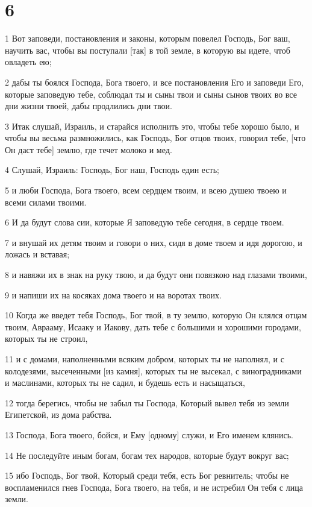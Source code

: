 \chapter{6}

\par 1 Вот заповеди, постановления и законы, которым повелел Господь, Бог ваш, научить вас, чтобы вы поступали [так] в той земле, в которую вы идете, чтоб овладеть ею;
\par 2 дабы ты боялся Господа, Бога твоего, и все постановления Его и заповеди Его, которые заповедую тебе, соблюдал ты и сыны твои и сыны сынов твоих во все дни жизни твоей, дабы продлились дни твои.
\par 3 Итак слушай, Израиль, и старайся исполнить это, чтобы тебе хорошо было, и чтобы вы весьма размножились, как Господь, Бог отцов твоих, говорил тебе, [что Он даст тебе] землю, где течет молоко и мед.
\par 4 Слушай, Израиль: Господь, Бог наш, Господь един есть;
\par 5 и люби Господа, Бога твоего, всем сердцем твоим, и всею душею твоею и всеми силами твоими.
\par 6 И да будут слова сии, которые Я заповедую тебе сегодня, в сердце твоем.
\par 7 и внушай их детям твоим и говори о них, сидя в доме твоем и идя дорогою, и ложась и вставая;
\par 8 и навяжи их в знак на руку твою, и да будут они повязкою над глазами твоими,
\par 9 и напиши их на косяках дома твоего и на воротах твоих.
\par 10 Когда же введет тебя Господь, Бог твой, в ту землю, которую Он клялся отцам твоим, Аврааму, Исааку и Иакову, дать тебе с большими и хорошими городами, которых ты не строил,
\par 11 и с домами, наполненными всяким добром, которых ты не наполнял, и с колодезями, высеченными [из камня], которых ты не высекал, с виноградниками и маслинами, которых ты не садил, и будешь есть и насыщаться,
\par 12 тогда берегись, чтобы не забыл ты Господа, Который вывел тебя из земли Египетской, из дома рабства.
\par 13 Господа, Бога твоего, бойся, и Ему [одному] служи, и Его именем клянись.
\par 14 Не последуйте иным богам, богам тех народов, которые будут вокруг вас;
\par 15 ибо Господь, Бог твой, Который среди тебя, есть Бог ревнитель; чтобы не воспламенился гнев Господа, Бога твоего, на тебя, и не истребил Он тебя с лица земли.
